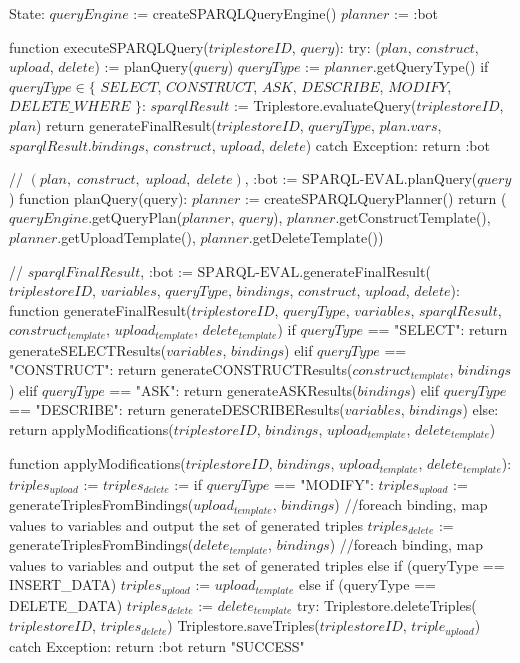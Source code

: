State:
    $queryEngine$ := createSPARQLQueryEngine()
    $planner$ := :bot

function executeSPARQLQuery($triplestoreID$, $query$):
    try:
        ($plan$, $construct$, $upload$, $delete$) := planQuery($query$) 
        $queryType$ := $planner$.getQueryType()
        if $queryType \in \{$ $SELECT$, $CONSTRUCT$, $ASK$, $DESCRIBE$, $MODIFY$, $DELETE\_WHERE$ $\}$:
            $sparqlResult$ := Triplestore.evaluateQuery($triplestoreID$, $plan$)
        return generateFinalResult($triplestoreID$, $queryType$, $plan$.$vars$, $sparqlResult$.$bindings$, $construct$, $upload$, $delete$)
    catch Exception:
        return :bot

// {$(plan, \; construct, \; upload, \; delete)$, :bot} := $\textrm{SPARQL-EVAL}$.planQuery($query$)
function planQuery(query):
    $planner$ := createSPARQLQueryPlanner()
    return ($queryEngine$.getQueryPlan($planner$, $query$), $planner$.getConstructTemplate(), $planner$.getUploadTemplate(), $planner$.getDeleteTemplate())

// {$sparqlFinalResult$, :bot} := $\textrm{SPARQL-EVAL}$.generateFinalResult($triplestoreID$, $variables$, $queryType$, $bindings$, $construct$, $upload$, $delete$):
function generateFinalResult($triplestoreID$, $queryType$, $variables$, $sparqlResult$, $construct_{template}$, $upload_{template}$, $delete_{template}$)
    if $queryType$ == "SELECT":
        return generateSELECTResults($variables$, $bindings$)
    elif $queryType$ == "CONSTRUCT":
        return generateCONSTRUCTResults($construct_{template}$, $bindings$)
    elif $queryType$ == "ASK":
        return generateASKResults($bindings$)
    elif $queryType$ == "DESCRIBE":
        return generateDESCRIBEResults($variables$, $bindings$)
    else:
        return applyModifications($triplestoreID$, $bindings$, $upload_{template}$, $delete_{template}$)   

function applyModifications($triplestoreID$, $bindings$, $upload_{template}$, $delete_{template}$):
    $triples_{upload}$ := {}
    $triples_{delete}$ := {}
    if $queryType$ == "MODIFY":
        $triples_{upload}$ := generateTriplesFromBindings($upload_{template}$, $bindings$) //foreach binding, map values to variables and output the set of generated triples
    $triples_{delete}$ := generateTriplesFromBindings($delete_{template}$, $bindings$) //foreach binding, map values to variables and output the set of generated triples
    else if (queryType == INSERT_DATA)
        $triples_{upload}$ := $upload_{template}$
    else if (queryType == DELETE_DATA)
        $triples_{delete}$ := $delete_{template}$
    try:
        Triplestore.deleteTriples($triplestoreID$, $triples_{delete}$)
        Triplestore.saveTriples($triplestoreID$, $triple_{upload}$)
    catch Exception:
        return :bot
    return "SUCCESS"


